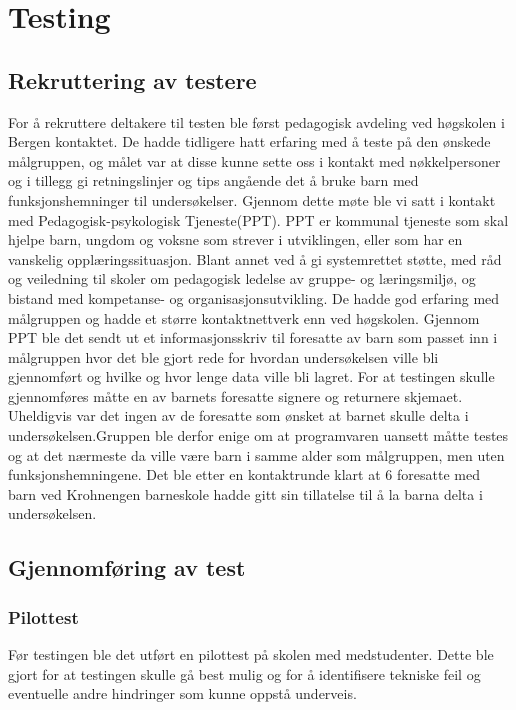 
\chapter{Testing}

\section{Rekruttering av testere}

For å rekruttere deltakere til testen ble først pedagogisk avdeling ved høgskolen i Bergen kontaktet. De hadde tidligere hatt erfaring med å teste på den ønskede målgruppen, og målet var at disse kunne sette oss i kontakt med nøkkelpersoner og i tillegg gi retningslinjer og tips angående det å bruke barn med funksjonshemninger til undersøkelser. Gjennom dette møte ble vi satt i kontakt med Pedagogisk-psykologisk Tjeneste(PPT). PPT er kommunal tjeneste som skal hjelpe barn, ungdom og voksne som strever i utviklingen, eller som har en vanskelig opplæringssituasjon. Blant annet ved å gi systemrettet støtte, med råd og veiledning til skoler om pedagogisk ledelse av gruppe- og læringsmiljø, og bistand med kompetanse- og organisasjonsutvikling. De hadde god erfaring med målgruppen og hadde et større kontaktnettverk
enn ved høgskolen. Gjennom PPT ble det sendt ut et informasjonsskriv til foresatte av barn som passet inn i målgruppen hvor det ble gjort rede for hvordan undersøkelsen ville bli gjennomført og hvilke og hvor lenge data ville bli lagret. For at testingen skulle gjennomføres måtte en av barnets foresatte signere og returnere skjemaet. Uheldigvis var det ingen av de foresatte som ønsket at barnet skulle delta i undersøkelsen.Gruppen ble derfor enige om at programvaren uansett måtte testes og at det nærmeste da ville være barn i samme alder som målgruppen, men uten funksjonshemningene. Det ble etter en kontaktrunde klart at 6 foresatte med barn ved Krohnengen barneskole hadde gitt sin tillatelse til å la barna delta i undersøkelsen.

\section{Gjennomføring av test}

\subsection{Pilottest}

Før testingen ble det utført en pilottest på skolen med medstudenter. Dette ble gjort for at testingen skulle gå best mulig og for å identifisere tekniske feil og eventuelle andre hindringer som kunne oppstå underveis.

